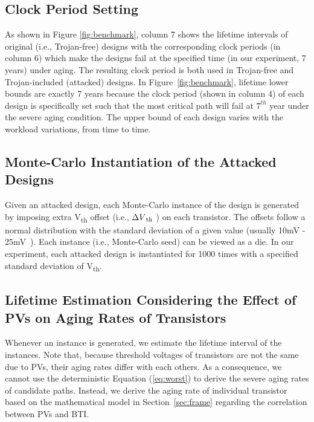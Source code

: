 \subsection{Clock Period Setting}
\label{sec:exp:tc}
As shown in Figure \ref{fig:benchmark}, column 7 shows the lifetime intervals of original (i.e., Trojan-free) designs with the corresponding clock periods (in column 6) which make the designs fail at the specified time (in our experiment, 7 years) under aging. The resulting clock period is both used in Trojan-free and Trojan-included (attacked) designs. In Figure~\ref{fig:benchmark}, lifetime lower bounds are exactly 7 years because the clock period (shown in column 4) of each design is specifically set such that the most critical path will fail at $7^{th}$ year under the severe aging condition. The upper bound of each design varies with the workload variations, from time to time.

\subsection{Monte-Carlo Instantiation of the Attacked Designs}
\label{sec:ins:mc_ins}
Given an attacked design, each Monte-Carlo instance of the design is generated by imposing extra V\textsubscript{th} offset (i.e., $\Delta V\textsubscript{th}$ ) on each transistor. The offsets follow a normal distribution with the standard deviation of a given value (usually 10mV - 25mV~\cite{han2011statistical}\cite{schlunder2017influence}). Each instance (i.e., Monte-Carlo seed) can be viewed as a die. In our experiment, each attacked design is instantiated for 1000 times with a specified standard deviation of V\textsubscript{th}. 

\subsection{Lifetime Estimation Considering the Effect of PVs on Aging Rates of Transistors}
\label{sec:ins:lt}
Whenever an instance is generated, we estimate the lifetime interval of the instances. Note that, because threshold voltages of transistors are not the same due to PVs, their aging rates differ with each others. As a consequence, we cannot use the deterministic Equation (\ref{eq:worst}) to derive the severe aging rates of candidate paths. Instead, we derive the aging rate of individual transistor based on the mathematical model in Section~\ref{sec:frame} regarding the correlation between PVs and BTI.

